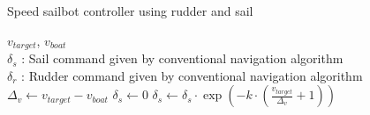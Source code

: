 \begin{algorithm}[H]
\caption{Speed sailbot controller using rudder and sail }
\label{alg:breahAlg}
\begin{algorithmic}[1]
\REQUIRE $v_{target}$, $v_{boat}$\\
   $\delta_s$ : Sail command given by conventional navigation algorithm\\
   $\delta_r$ : Rudder command given by conventional navigation algorithm\\
\STATE $\Delta_{v} \leftarrow v_{target} - v_{boat}$
\STATE $\delta_s \leftarrow 0$
\ELSE
{}
\STATE $\delta_s \leftarrow \delta_s \cdot \exp(-k \cdot (\frac{v_{target}}{\Delta_v}+1)) $
\ENDIF
\ENDIF
\end{algorithmic}
\end{algorithm}

